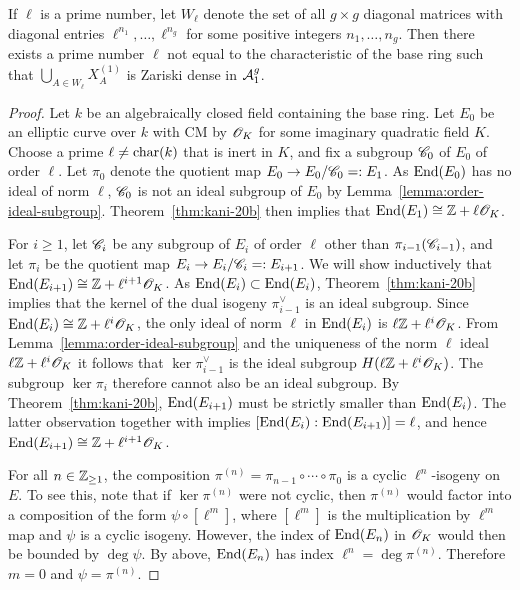 \documentclass{amsart}
\begin{document}
\begin{theorem}\label{thm:curves-dense-a1}
  If $\ell$ is a prime number, let $W_\ell$ denote the set of all $g \times g$ diagonal matrices with diagonal entries $\ell^{n_1},\dots,\ell^{n_g}$ for some positive integers $n_1,\dots,n_g$. 
  Then there exists a prime number $\ell$ not equal to the characteristic of the base ring such that $\bigcup_{A\in W_\ell} X^{(1)}_A$ is Zariski dense in $\mathcal{A}_1^g$.
\end{theorem}
\begin{proof}
 Let $k$ be an algebraically closed field containing the base ring. Let $E_0$ be an elliptic curve over $k$ with CM by $\mathscr{O}_K$ for some imaginary quadratic field $K$. Choose a prime $\ell\neq\operatorname{char}(k)$ that is inert in $K$, and fix a subgroup $\mathscr{C}_0$ of $E_0$ of order $\ell$. Let $\pi_0$ denote the quotient map $E_0 \to E_0/\mathscr{C}_0 =: E_1$. As $\operatorname{End}(E_0)$ has no ideal of norm $\ell$, $\mathscr{C}_0$ is not an  ideal subgroup of $E_0$ by Lemma~\ref{lemma:order-ideal-subgroup}. Theorem~\ref{thm:kani-20b} then implies that $\operatorname{End}(E_1) \cong \mathbb{Z} + \ell\mathscr{O}_K$.

 For $i \ge 1$, let $\mathscr{C}_i$ be any subgroup of $E_i$ of order $\ell$ other than $\pi_{i-1}(\mathscr{C}_{i-1})$, and let $\pi_i$ be the quotient map $E_i \to E_i/\mathscr{C}_i =: E_{i+1}$. We will show inductively that $\operatorname{End}(E_{i+1}) \cong \mathbb{Z} + \ell^{i+1}\mathscr{O}_{K}$. As $\operatorname{End}(E_{i}) \subset \operatorname{End}(E_i)$, Theorem~\ref{thm:kani-20b} implies that the kernel of the dual isogeny $\pi_{i-1}^\vee$ is an ideal subgroup. Since $\operatorname{End}(E_{i}) \cong \mathbb{Z} + \ell^{i}\mathscr{O}_{K}$, the only ideal of norm $\ell$ in $\operatorname{End}(E_{i})$ is $\ell\mathbb{Z} + \ell^i\mathscr{O}_K$. From Lemma~\ref{lemma:order-ideal-subgroup} and the uniqueness of the norm $\ell$ ideal $\ell\mathbb{Z} + \ell^i\mathscr{O}_K$ it follows that $\ker \pi_{i-1}^\vee$ is the ideal subgroup $H(\ell\mathbb{Z} + \ell^i\mathscr{O}_K)$. The subgroup $\ker\pi_i$ therefore cannot also be an ideal subgroup. By Theorem~\ref{thm:kani-20b}, $\operatorname{End}(E_{i+1})$ must be strictly smaller than $\operatorname{End}(E_{i})$. The latter observation together with \cite[Prop.~5]{kohel1996endomorphism} implies $[\operatorname{End}(E_i):\operatorname{End}(E_{i+1})] = \ell$, and hence $\operatorname{End}(E_{i+1}) \cong \mathbb{Z} + \ell^{i+1}\mathscr{O}_{K}$.

 For all $n \in \mathbb{Z}_{\ge 1}$, the composition $\pi^{(n)} = \pi_{n-1} \circ \cdots \circ \pi_0$ is a cyclic $\ell^n$-isogeny on $E$. To see this, note that if $\ker\pi^{(n)}$ were not cyclic, then $\pi^{(n)}$ would factor into a composition of the form $\psi\circ[\ell^m]$, where $[\ell^m]$ is the multiplication by $\ell^m$ map and $\psi$ is a cyclic isogeny. However, the index of $\operatorname{End}(E_n)$ in $\mathscr{O}_K$ would then be bounded by $\deg\psi$. By above, $\operatorname{End}(E_n)$ has index $\ell^n = \deg\pi^{(n)}$. Therefore $m = 0$ and $\psi = \pi^{(n)}$.


\end{proof}
\end{document}
